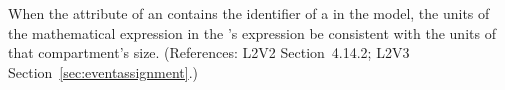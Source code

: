 When the  attribute of an \EventAssignment
contains the identifier of a \Compartment in the model, the
units of the mathematical expression in the
\EventAssignment's  expression  be
consistent with the units of that compartment's size.
(References: L2V2 Section~4.14.2; L2V3 Section~\ref{sec:eventassignment}.)
